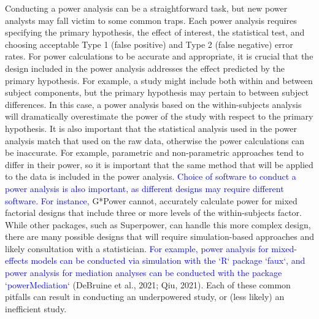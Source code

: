 \documentclass[
  man, donotrepeattitle,mask,floatsintext]{apa7}
\begin{document}
Conducting a power analysis can be a straightforward task, but new power analysts may fall victim to some common traps. Each power analysis requires specifying the primary hypothesis, the effect of interest, the statistical test, and choosing acceptable Type 1 (false positive) and Type 2 (false negative) error rates. For power calculations to be accurate and appropriate, it is crucial that the design included in the power analysis addresses the effect predicted by the primary hypothesis. For example, a study might include both within and between subject components, but the primary hypothesis may pertain to between subject differences. In this case, a power analysis based on the within-subjects analysis will dramatically overestimate the power of the study with respect to the primary hypothesis. It is also important that the statistical analysis used in the power analysis match that used on the raw data, otherwise the power calculations can be inaccurate. For example, parametric and non-parametric approaches tend to differ in their power, so it is important that the same method that will be applied to the data is included in the power analysis. \textcolor{blue}{Choice of software to conduct a power analysis is also important, as different designs may require different software. For instance,} G*Power cannot, accurately calculate power for mixed factorial designs that include three or more levels of the within-subjects factor. While other packages, such as Superpower, can handle this more complex design, there are many possible designs that will require simulation-based approaches and likely consultation with a statistician. \textcolor{blue}{For example, power analysis for mixed-effects models can be conducted via simulation with the `R` package `faux`, and power analysis for mediation analyses can be conducted with the package `powerMediation`} (DeBruine et al., 2021; Qiu, 2021). Each of these common pitfalls can result in conducting an underpowered study, or (less likely) an inefficient study.
\end{document}
